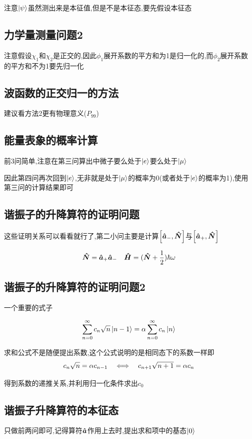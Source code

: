 \documentclass{article}
\begin{document}
            注意$\ket{\psi}$虽然测出来是本征值,但是不是本征态,要先假设本征态


        \subsection{力学量测量问题2}
            注意假设$\chi_{1}$和$\chi_{2}$是正交的,因此$\phi_{1}$展开系数的平方和为1是归一化的,而$\phi_{2}$展开系数的平方和不为1要先归一化

        \subsection{波函数的正交归一的方法}
            建议看方法2更有物理意义($P_{99}$)

        \subsection{能量表象的概率计算}
            前3问简单,注意在第三问算出中微子要么处于$\ket{e}$要么处于$\ket{\mu}$

            因此第四问再次回到$\ket{e}$,无非就是处于$\ket{\mu}$的概率为0(或者处于$\ket{e}$的概率为1),使用第三问的计算结果即可

        \subsection{谐振子的升降算符的证明问题}
            这些证明关系可以看看就行了,第二小问主要是计算$\comm{\vu*{a}_{-}}{\vu*{N}}$与$\comm{\vu*{a}_{+}}{\vu*{N}}$

            $$ \vu*{N} = \vu*{a}_{+} \vu*{a}_{-} \quad \vu*{H} = (\vu*{N} + \frac{1}{2}) \hbar \omega $$
        \subsection{谐振子的升降算符的证明问题2}
            一个重要的式子

            $$ \sum_{n=0}^{\infty} c_{n} \sqrt{n} \ket{n-1} = \alpha \sum_{n=0}^{\infty} c_{n} \ket{n} $$

            求和公式不是随便提出系数,这个公式说明的是相同态下的系数一样即
            $$ c_{n} \sqrt{n}  = \alpha c_{n-1} \quad  \Longleftrightarrow \quad c_{n+1} \sqrt{n+1} = \alpha c_{n} $$

            得到系数的递推关系,并利用归一化条件求出$c_{0}$

        \subsection{谐振子升降算符的本征态}
            只做前两问即可,记得算符$\vu*{a}$作用上去时,提出求和项中的基态$\ket{0}$
        
\end{document}
